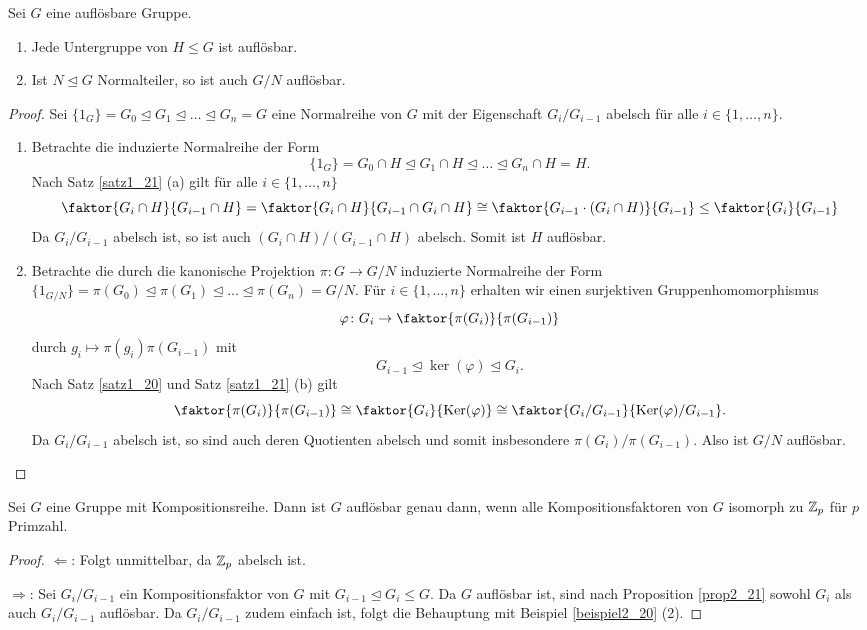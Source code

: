 \begin{prop}\label{prop2_21}
	Sei $G$ eine auflösbare Gruppe.
	\begin{enumerate}[label=(\alph*)]
		\item Jede Untergruppe von $H \leq G$ ist auflösbar.
		\item Ist $N \unlhd G$ Normalteiler, so ist auch $G/N$ auflösbar. 
	\end{enumerate}
\end{prop}
\begin{proof}
	Sei $\{1_G\} = G_0 \unlhd G_1 \unlhd \dots \unlhd G_n = G$ eine Normalreihe von $G$ mit der Eigenschaft $G_i/G_{i-1}$ abelsch für alle $i \in \{1, \dots, n\}$.
	\begin{enumerate}[label=(\alph*)]
		\item Betrachte die induzierte Normalreihe der Form
		\[\{1_G\} = G_0 \cap H \unlhd G_1 \cap H \unlhd \dots \unlhd G_n \cap H = H.\]
		Nach Satz \ref{satz1_21} (a) gilt für alle $i \in \{1, \dots, n\}$
		\[\faktor{G_i \cap H}{G_{i-1} \cap H} = \faktor{G_i \cap H}{G_{i-1} \cap G_i \cap H} \cong \faktor{G_{i-1} \cdot (G_i \cap H)}{G_{i-1}} \leq \faktor{G_i}{G_{i-1}}\]
		Da $G_i / G_{i-1}$ abelsch ist, so ist auch $(G_i \cap H) / (G_{i-1}\cap H)$ abelsch. Somit ist $H$ auflösbar.
		
		\item Betrachte die durch die kanonische Projektion $\pi \colon G \to G/N$ induzierte Normalreihe der Form $\{1_{G/N}\} = \pi(G_0) \unlhd \pi(G_1) \unlhd \dots \unlhd \pi(G_n) = G/N$. Für $i \in \{1, \dots, n\}$ erhalten wir einen surjektiven Gruppenhomomorphismus 
		\[\varphi \colon G_i \to \faktor{\pi(G_i)}{\pi(G_{i-1})}\]
		durch $g_i \mapsto \pi(g_i)\pi(G_{i-1})$ mit 
		\[G_{i-1} \unlhd \ker(\varphi) \unlhd G_i.\]
		Nach Satz \ref{satz1_20} und Satz \ref{satz1_21} (b) gilt
		\[\faktor{\pi(G_i)}{\pi(G_{i-1})} \cong \faktor{G_i}{\ker(\varphi)} \cong \faktor{G_i / G_{i-1}}{\ker(\varphi) / G_{i-1}}.\]
		Da $G_i / G_{i-1}$ abelsch ist, so sind auch deren Quotienten abelsch und somit insbesondere $\pi(G_i) / \pi(G_{i-1})$. Also ist $G/N$ auflösbar.
	\end{enumerate}
\end{proof}
\begin{satz}\label{satz2_22}
	Sei $G$ eine Gruppe mit Kompositionsreihe. Dann ist $G$ auflösbar genau dann, wenn alle Kompositionsfaktoren von $G$ isomorph zu $\mathbb{Z}_p$ für $p$ Primzahl.
\end{satz}
\begin{proof}
	\glqq{}$\Leftarrow$\grqq: Folgt unmittelbar, da $\mathbb{Z}_p$ abelsch ist.
	
	\glqq{}$\Rightarrow$\grqq: Sei $G_i / G_{i-1}$ ein Kompositionsfaktor von $G$ mit $G_{i-1} \unlhd G_i \leq G$. Da $G$ auflösbar ist, sind nach Proposition \ref{prop2_21} sowohl $G_i$ als auch $G_i / G_{i-1}$ auflösbar. Da $G_i / G_{i-1}$ zudem einfach ist, folgt die Behauptung mit Beispiel \ref{beispiel2_20} (2).
\end{proof}




